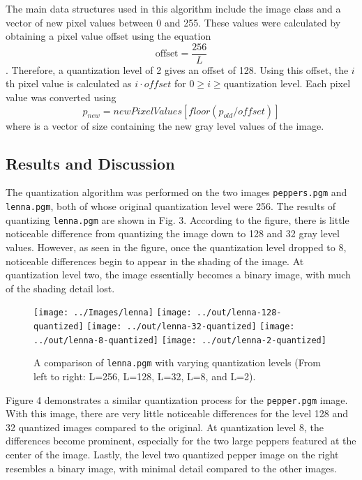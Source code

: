 \documentclass[headings=optiontoheadandtoc,listof=totoc,parskip=full]{scrartcl}
\begin{document}
The main data structures used in this algorithm include the image class and a vector of new pixel values between 0 and 255. These values were calculated by obtaining a pixel value offset using the equation \[\text{offset} = \frac{256}{L}\]. Therefore, a quantization level of 2 gives an offset of 128. Using this offset, the $i$th pixel value is calculated as $i \cdot offset$ for $0 \geq i \geq \text{quantization level}$. Each pixel value was converted using \[
p_{new}=newPixelValues[ floor(p_{old} / offset) ]
\] where  is a vector of size  containing the new gray level values of the image.

\subsection{Results and Discussion}

The quantization algorithm was performed on the two images \texttt{peppers.pgm} and \texttt{lenna.pgm}, both of whose original quantization level were 256. The results of quantizing \texttt{lenna.pgm} are shown in Fig. 3. According to the figure, there is little noticeable difference from quantizing the image down to 128 and 32 gray level values. However, as seen in the figure, once the quantization level dropped to 8, noticeable differences begin to appear in the shading of the image. At quantization level two, the image essentially becomes a binary image, with much of the shading detail lost.

\begin{figure}[ht]
	\centering
	\texttt{[image: ../Images/lenna]}
	\texttt{[image: ../out/lenna-128-quantized]}
	\texttt{[image: ../out/lenna-32-quantized]}
	\texttt{[image: ../out/lenna-8-quantized]}
	\texttt{[image: ../out/lenna-2-quantized]}
	\caption{A comparison of \texttt{lenna.pgm} with varying quantization levels (From left to right: L=256, L=128, L=32, L=8, and L=2).}
	\label{fig:equal-result-2}
\end{figure}

Figure 4 demonstrates a similar quantization process for the \texttt{pepper.pgm} image. With this image, there are very little noticeable differences for the level 128 and 32 quantized images compared to the original. At quantization level 8, the differences become prominent, especially for the two large peppers featured at the center of the image. Lastly, the level two quantized pepper image on the right resembles a binary image, with minimal detail compared to the other images.
\end{document}
